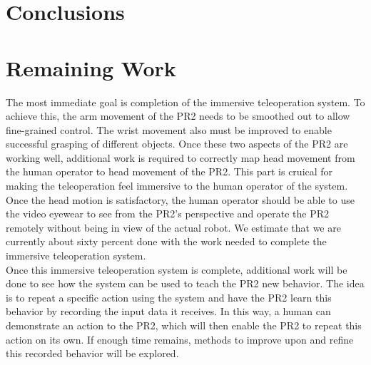 \documentclass{sig-alternate}
\begin{document}
\section{Conclusions}
\label{sec:conclusions}

\section{Remaining Work}
\label{sec:remaining_work}
\indent The most immediate goal is completion of the immersive teleoperation system. To achieve this, the arm movement of the PR2 needs to be smoothed out to allow fine-grained control. The wrist movement also must be improved to enable successful grasping of different objects. Once these two aspects of the PR2 are working well, additional work is required to correctly map head movement from the human operator to head movement of the PR2. This part is cruical for making the teleoperation feel immersive to the human operator of the system. Once the head motion is satisfactory, the human operator should be able to use the video eyewear to see from the PR2's perspective and operate the PR2 remotely without being in view of the actual robot. We estimate that we are currently about sixty percent done with the work needed to complete the immersive teleoperation system.\\
\indent Once this immersive teleoperation system is complete, additional work will be done to see how the system can be used to teach the PR2 new behavior. The idea is to repeat a specific action using the system and have the PR2 learn this behavior by recording the input data it receives. In this way, a human can demonstrate an action to the PR2, which will then enable the PR2 to repeat this action on its own. If enough time remains, methods to improve upon and refine this recorded behavior will be explored.
\end{document}

